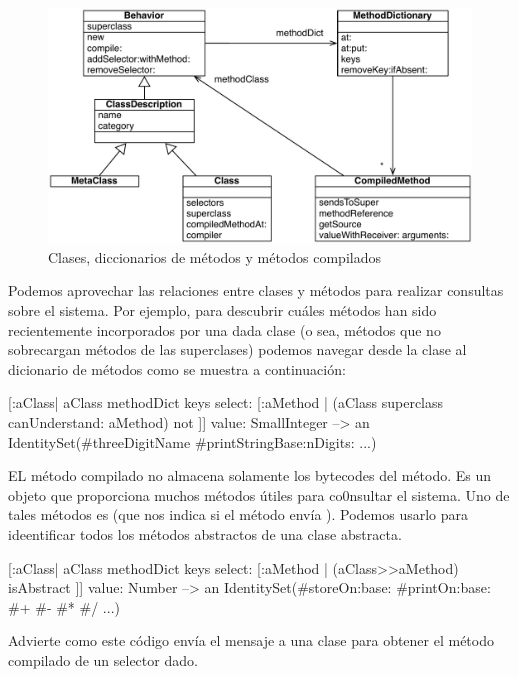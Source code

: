 \documentclass[a4paper,10pt,twoside]{book}
\begin{document}
\begin{figure}[ht]\centering
        \includegraphics[width=\linewidth]{MethodsAsObjects}
        \caption{Clases, diccionarios de métodos y métodos compilados}
\end{figure}

Podemos aprovechar las relaciones entre clases y métodos para realizar
consultas sobre el sistema.  Por ejemplo, para descubrir cuáles
métodos han sido recientemente incorporados por una dada clase (o sea,
métodos que no sobrecargan métodos de las superclases) podemos navegar
desde la clase al dicionario de métodos como se muestra a
continuación:
\begin{code}{}
[:aClass| aClass methodDict keys select: [:aMethod |
  (aClass superclass canUnderstand: aMethod) not ]] value: SmallInteger
  --> an IdentitySet(#threeDigitName #printStringBase:nDigits: ...)
\end{code}

EL método compilado no almacena solamente los bytecodes del método.
Es un objeto que proporciona muchos métodos útiles para co0nsultar el
sistema.  Uno de tales métodos es  (que nos indica si
el método envía ).  Podemos usarlo para
ideentificar todos los métodos abstractos de una clase abstracta.
\begin{code}{}
[:aClass| aClass methodDict keys select: [:aMethod |
  (aClass>>aMethod) isAbstract ]] value: Number
  --> an IdentitySet(#storeOn:base: #printOn:base: #+ #- #* #/ ...)
\end{code}
Advierte como este código envía el mensaje \ct{>>} a una clase para
obtener el método compilado de un selector dado.

\end{document}
